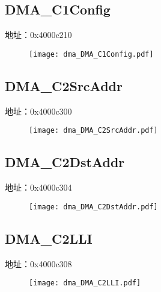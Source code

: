 \subsection{DMA\_C1Config}
\label{dma-DMA-C1Config}
地址：0x4000c210
 \begin{figure}[H]
\texttt{[image: dma\_DMA\_C1Config.pdf]}
\end{figure}

\subsection{DMA\_C2SrcAddr}
\label{dma-DMA-C2SrcAddr}
地址：0x4000c300
 \begin{figure}[H]
\texttt{[image: dma\_DMA\_C2SrcAddr.pdf]}
\end{figure}

\subsection{DMA\_C2DstAddr}
\label{dma-DMA-C2DstAddr}
地址：0x4000c304
 \begin{figure}[H]
\texttt{[image: dma\_DMA\_C2DstAddr.pdf]}
\end{figure}

\subsection{DMA\_C2LLI}
\label{dma-DMA-C2LLI}
地址：0x4000c308
 \begin{figure}[H]
\texttt{[image: dma\_DMA\_C2LLI.pdf]}
\end{figure}

